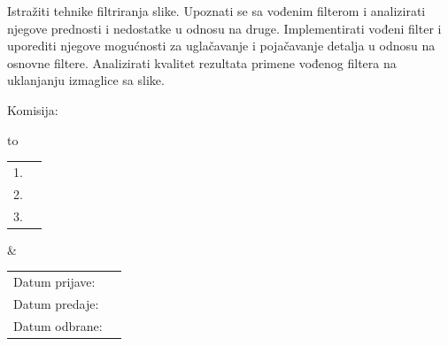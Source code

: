 \documentclass[a4paper,12pt,titlepage]{article}
\begin{document}
   \noindent

 \noindent
Istražiti tehnike filtriranja slike. Upoznati se sa vođenim filterom i analizirati njegove prednosti i nedostatke u odnosu na druge. Implementirati vođeni filter i uporediti njegove mogućnosti za uglačavanje i pojačavanje detalja u odnosu na osnovne filtere. Analizirati kvalitet rezultata primene vođenog filtera na uklanjanju izmaglice sa slike. 
  
\vspace{17cm}

   \noindent
    Komisija:
    
    \vspace{0.1cm}
    
    \noindent
    \begin{tabu} to   
         \begin{tabular}{@{}ll}
            1. & \underline{\hspace{6.5cm}}\\
            2. & \underline{\hspace{6.5cm}}\\
            3. & \underline{\hspace{6.5cm}}
        \end{tabular}  
        
    &
   
        \begin{tabular}{ll@{}}
            Datum prijave: & \underline{\hspace{3cm}}\\
            Datum predaje: & \underline{\hspace{3cm}}\\
            Datum odbrane: & \underline{\hspace{3cm}}
        \end{tabular}
  
    \end{tabu}
    
    \thispagestyle{empty}
    \newpage


\tableofcontents

\setlength{\parskip}{\baselineskip}%
\setlength{\parindent}{15pt}%

\thispagestyle{empty}
\newpage
\end{document}
